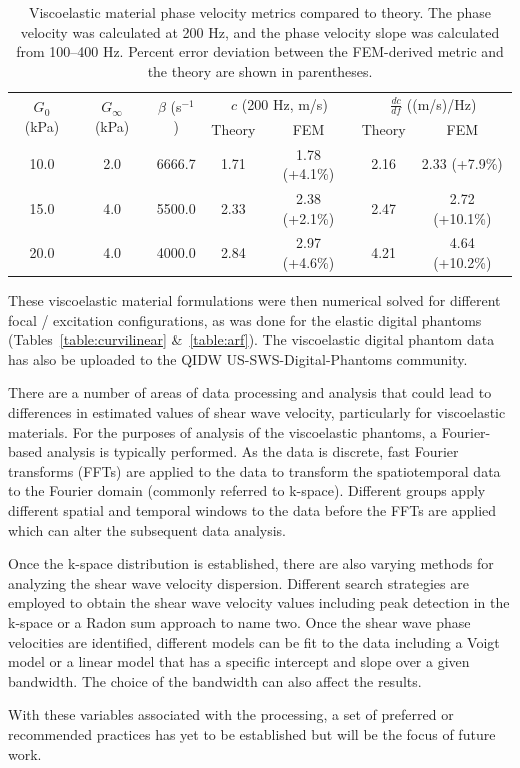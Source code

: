 \begin{table}[htb!]
    \centering
    \caption{Viscoelastic material phase velocity metrics compared to theory.
        The phase velocity was calculated at 200 Hz, and the phase velocity
        slope was calculated from 100--400 Hz.  Percent error deviation between
        the FEM-derived metric and the theory are shown in parentheses.}
    \begin{tabular}{|c|c|c|c|c|c|c|}
    \hline
    \multirow{2}{*}{$G_0$ (kPa)} & \multirow{2}{*}{$G_\infty$ (kPa)} & \multirow{2}{*}{$\beta$ (s$^{-1}$)} & \multicolumn{2}{c|}{$c$ (200 Hz, m/s)} & \multicolumn{2}{c|}{$\frac{dc}{df}$ ((m/s)/Hz)} \\ \cline{4-7}
            & & & Theory & FEM & Theory & FEM \\ 
            \hline
            10.0 & 2.0 & 6666.7 & 1.71 & 1.78 (+4.1\%) & 2.16 & 2.33 (+7.9\%) \\ \hline
            15.0 & 4.0 & 5500.0 & 2.33 & 2.38 (+2.1\%) & 2.47 & 2.72 (+10.1\%) \\ \hline
            20.0 & 4.0 & 4000.0 & 2.84 & 2.97 (+4.6\%) & 4.21 & 4.64 (+10.2\%) \\
    \hline
    \end{tabular}
\label{table:ve_data}
\end{table}

These viscoelastic material formulations were then numerical solved for
different focal / excitation configurations, as was done for the elastic
digital phantoms (Tables~\ref{table:curvilinear} \&~\ref{table:arf}).  The
viscoelastic digital phantom data has also be uploaded to the QIDW
US-SWS-Digital-Phantoms community.

There are a number of areas of data processing and analysis that could lead to
differences in estimated values of shear wave velocity, particularly for
viscoelastic materials. For the purposes of analysis of the viscoelastic
phantoms, a Fourier-based analysis is typically performed. As the data is
discrete, fast Fourier transforms (FFTs) are applied to the data to transform
the spatiotemporal data to the Fourier domain (commonly referred to k-space).
Different groups apply different spatial and temporal windows to the data
before the FFTs are applied which can alter the subsequent data analysis.

Once the k-space distribution is established, there are also varying methods
for analyzing the shear wave velocity dispersion. Different search strategies
are employed to obtain the shear wave velocity values including peak detection
in the k-space or a Radon sum approach to name two. Once the shear wave phase
velocities are identified, different models can be fit to the data including a
Voigt model or a linear model that has a specific intercept and slope over a
given bandwidth. The choice of the bandwidth can also affect the results.

With these variables associated with the processing, a set of preferred or
recommended practices has yet to be established but will be the focus of future
work.
